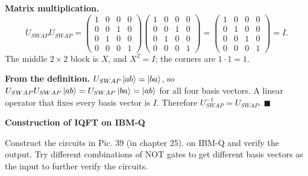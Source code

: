 \documentclass[a4paper, 10pt]{article}
\begin{document}
\begin{solution}
	\noindent \textbf{Matrix multiplication.}
	\[
		U_{SWAP}U_{SWAP} = \begin{pmatrix}
			1 & 0 & 0 & 0 \\
			0 & 0 & 1 & 0 \\
			0 & 1 & 0 & 0 \\
			0 & 0 & 0 & 1
		\end{pmatrix}\begin{pmatrix}
			1 & 0 & 0 & 0 \\
			0 & 0 & 1 & 0 \\
			0 & 1 & 0 & 0 \\
			0 & 0 & 0 & 1
		\end{pmatrix} = \begin{pmatrix}
			1 & 0 & 0 & 0 \\
			0 & 1 & 0 & 0 \\
			0 & 0 & 1 & 0 \\
			0 & 0 & 0 & 1
		\end{pmatrix} = I.
	\]
	The middle \( 2 \times 2 \) block is \( X \), and \( X^2 = I \); the corners are \( 1 \cdot 1 = 1 \).

	\myspace

	\noindent \textbf{From the definition.} \( U_{SWAP}\ket{ab} = \ket{ba} \), so \( U_{SWAP}U_{SWAP}\ket{ab} = U_{SWAP}\ket{ba} = \ket{ab} \) for all four basis vectors. A linear operator that fixes every basis vector is \( I \).
	Therefore \( U_{SWAP}^{-1} = U_{SWAP} \). \( \blacksquare \)
\end{solution}

\newpage

\begin{problem}
\textbf{Construction of IQFT on IBM-Q}
\par Construct the circuits in Pic. 39 (in chapter 25). on IBM-Q and verify the output.
Try different combinations of NOT gates to get different basis vectors as the input to further verify the circuits.
\end{problem}
\end{document}
